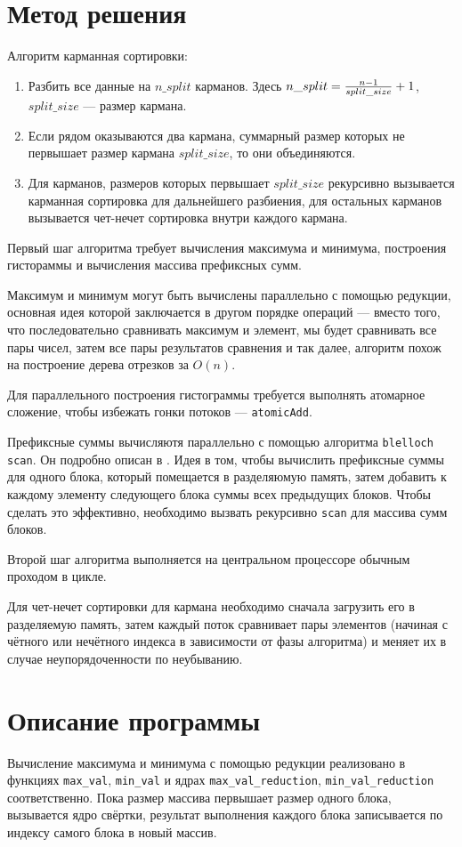 \section{Метод решения}
Алгоритм карманная сортировки:
\begin{enumerate}
\item Разбить все данные на $n\_split$ карманов. Здесь $n\_split = {{n - 1} \over {split\_size}} + 1$, $split\_size$ --- размер кармана.
\item Если рядом оказываются два кармана, суммарный размер которых не первышает размер кармана $split\_size$, то они объединяются.
\item Для карманов, размеров которых первышает $split\_size$ рекурсивно вызывается карманная сортировка для дальнейшего разбиения, для остальных карманов вызывается чет-нечет сортировка внутри каждого кармана.
\end{enumerate}

Первый шаг алгоритма требует вычисления максимума и минимума, построения гистораммы и вычисления массива префиксных сумм.

Максимум и минимум могут быть вычислены параллельно с помощью редукции, основная идея которой заключается в другом порядке операций --- вместо того, что последовательно сравнивать максимум и элемент, мы будет сравнивать все пары чисел, затем все пары результатов сравнения и так далее, алгоритм похож на построение дерева отрезков за $O(n)$.

Для параллельного построения гистограммы требуется выполнять атомарное сложение, чтобы избежать гонки потоков --- \texttt{atomicAdd}.

Префиксные суммы вычисляютя параллельно с помощью алгоритма \texttt{blelloch scan}. Он подробно описан в \cite{scan}. Идея в том, чтобы вычислить префиксные суммы для одного блока, который помещается в разделяюмую память, затем добавить к каждому элементу следующего блока суммы всех предыдущих блоков. Чтобы сделать это эффективно, необходимо вызвать рекурсивно \texttt{scan} для массива сумм блоков.

Второй шаг алгоритма выполняется на центральном процессоре обычным проходом в цикле.

Для чет-нечет сортировки для кармана необходимо сначала загрузить его в разделяемую память, затем каждый поток сравнивает пары элементов (начиная с чётного или нечётного индекса в зависимости от фазы алгоритма) и меняет их в случае неупорядоченности по неубыванию.
\pagebreak

\section{Описание программы}
Вычисление максимума и минимума с помощью редукции реализовано в функциях \texttt{max\_val}, \texttt{min\_val} и ядрах \texttt{max\_val\_reduction}, \texttt{min\_val\_reduction} соответственно. Пока размер массива первышает размер одного блока, вызывается ядро свёртки, результат выполнения каждого блока записывается по индексу самого блока в новый массив.

